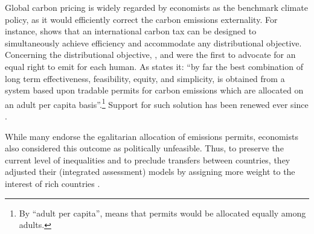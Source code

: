 Global carbon pricing is widely regarded by economists as the benchmark climate policy, as it would efficiently correct the carbon emissions externality. For instance, \citet{hoel_carbon_1991} shows that an international carbon tax can be designed to simultaneously achieve efficiency and accommodate any distributional objective. 
Concerning the distributional objective, \citet{grubb_greenhouse_1990}, \citet{agarwal_global_1991} and \citet{bertram_tradeable_1992} were the first to advocate for an equal right to emit for each human. As \citet{grubb_greenhouse_1990} states it: ``by far the best combination of long term effectiveness, feasibility, equity, and simplicity, is obtained from a system based upon tradable permits for carbon emissions which are allocated on an adult per capita basis''.\footnote{By ``adult per capita'', \citet{grubb_greenhouse_1990} means that permits would be allocated equally among adults.} Support for such solution has been renewed ever since \citep{baer_equity_2000,jamieson_climate_2001,blanchard_major_2021,rajan_global_2021}. %

While many endorse the egalitarian allocation of emissions permits, economists also considered this outcome as politically unfeasible. Thus, to preserve the current level of inequalities and to preclude transfers between countries, they adjusted their (integrated assessment) models by assigning more weight to the interest of rich countries \citep{stanton_negishi_2011}.  %

